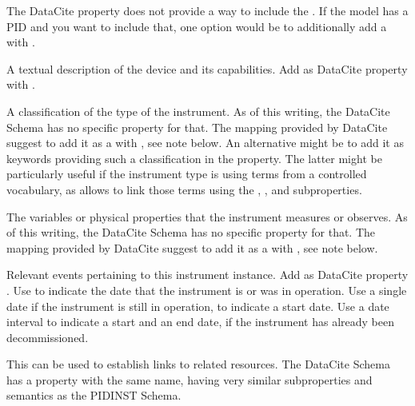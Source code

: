 \documentclass[a4paper,10pt,english]{sphinxmanual}
\begin{document}
\begin{description}
\sphinxAtStartPar
The DataCite property  does not provide a way to
include the .  If the model has a PID and you want
to include that, one option would be to additionally add a
 with .

\item[{\sphinxtitleref{Description}}] \leavevmode
\sphinxAtStartPar
A textual description of the device and its capabilities.  Add as
DataCite property  with .

\item[{\sphinxtitleref{InstrumentType}}] \leavevmode
\sphinxAtStartPar
A classification of the type of the instrument.  As of this writing,
the DataCite Schema has no specific property for that.  The mapping
provided by DataCite suggest to add it as a  with
, see note below.  An alternative
might be to add it as keywords providing such a classification in
the  property.  The latter might be particularly useful if
the instrument type is using terms from a controlled vocabulary, as
 allows to link those terms using the ,
, and  subproperties.

\item[{\sphinxtitleref{MeasuredVariable}}] \leavevmode
\sphinxAtStartPar
The variables or physical properties that the instrument measures or
observes.  As of this writing, the DataCite Schema has no specific
property for that.  The mapping provided by DataCite suggest to add
it as a  with , see note
below.

\item[{\sphinxtitleref{Date}}] \leavevmode
\sphinxAtStartPar
Relevant events pertaining to this instrument instance.  Add as
DataCite property .  Use  to indicate the
date that the instrument is or was in operation.  Use a single date
if the instrument is still in operation, to indicate a start date.
Use a date interval to indicate a start and an end date, if the
instrument has already been decommissioned.

\item[{\sphinxtitleref{RelatedIdentifier}}] \leavevmode
\sphinxAtStartPar
This can be used to establish links to related resources.  The
DataCite Schema has a property with the same name, having very
similar subproperties and semantics as the PIDINST Schema.


\end{description}
\end{document}
